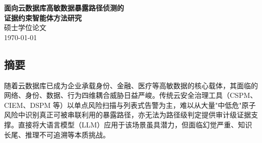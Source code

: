 \documentclass[a4paper,12pt]{ctexart}
\begin{document}
\begin{titlepage}
\centering
\vspace*{2cm}
{\LARGE\bfseries 面向云数据库高敏数据暴露路径侦测的\\[0.4em]证据约束智能体方法研究}\\[2em]
{\large 硕士学位论文}\\[6cm]
{\large \today}
\end{titlepage}

\tableofcontents
\newpage

\subsection{摘要}

随着云数据库已成为企业承载身份、金融、医疗等高敏数据的核心载体，其面临的网络、身份、数据、行为四维耦合威胁日益严峻。传统云安全治理工具（CSPM、CIEM、DSPM 等）以单点风险扫描与列表式告警为主，难以从大量"中低危"原子风险中识别真正可被串联利用的暴露路径，亦无法为路径级判定提供审计级证据支撑。直接将大语言模型（LLM）应用于该场景虽具潜力，但面临幻觉严重、知识长尾、推理不可追溯等本质挑战。
\end{document}
